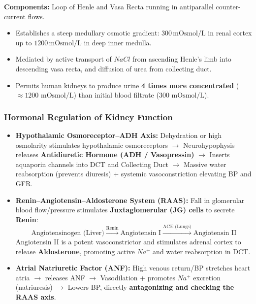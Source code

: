 \documentclass[11pt,a4paper]{article}
\begin{document}
\begin{formulabox}
\textbf{Components:} Loop of Henle and Vasa Recta running in antiparallel counter-current flows.
\begin{itemize}[leftmargin=1.2em, itemsep=2pt]
  \item Establishes a steep medullary osmotic gradient: $300 \, \text{mOsmol/L}$ in renal cortex up to $1200 \, \text{mOsmol/L}$ in deep inner medulla.
  \item Mediated by active transport of $NaCl$ from ascending Henle's limb into descending vasa recta, and diffusion of urea from collecting duct.
  \item Permits human kidneys to produce urine \textbf{4 times more concentrated} ($\approx 1200\text{ mOsmol/L}$) than initial blood filtrate ($300\text{ mOsmol/L}$).
\end{itemize}
\end{formulabox}

\subsubsection{Hormonal Regulation of Kidney Function}
\begin{itemize}[leftmargin=1.5em, itemsep=2pt]
  \item \textbf{Hypothalamic Osmoreceptor--ADH Axis:} Dehydration or high osmolarity stimulates hypothalamic osmoreceptors $\to$ Neurohypophysis releases \textbf{Antidiuretic Hormone (ADH / Vasopressin)} $\to$ Inserts aquaporin channels into DCT and Collecting Duct $\to$ Massive water reabsorption (prevents diuresis) + systemic vasoconstriction elevating BP and GFR.
  \item \textbf{Renin--Angiotensin--Aldosterone System (RAAS):} Fall in glomerular blood flow/pressure stimulates \textbf{Juxtaglomerular (JG) cells} to secrete \textbf{Renin}:
  \[
    \text{Angiotensinogen (Liver)} \xrightarrow{\text{Renin}} \text{Angiotensin I} \xrightarrow{\text{ACE (Lungs)}} \text{Angiotensin II}
  \]
  Angiotensin II is a potent vasoconstrictor and stimulates adrenal cortex to release \textbf{Aldosterone}, promoting active $Na^+$ and water reabsorption in DCT.
  \item \textbf{Atrial Natriuretic Factor (ANF):} High venous return/BP stretches heart atria $\to$ releases ANF $\to$ Vasodilation + promotes $Na^+$ excretion (natriuresis) $\to$ Lowers BP, directly \textbf{antagonizing and checking the RAAS axis}.
\end{itemize}
\end{document}

